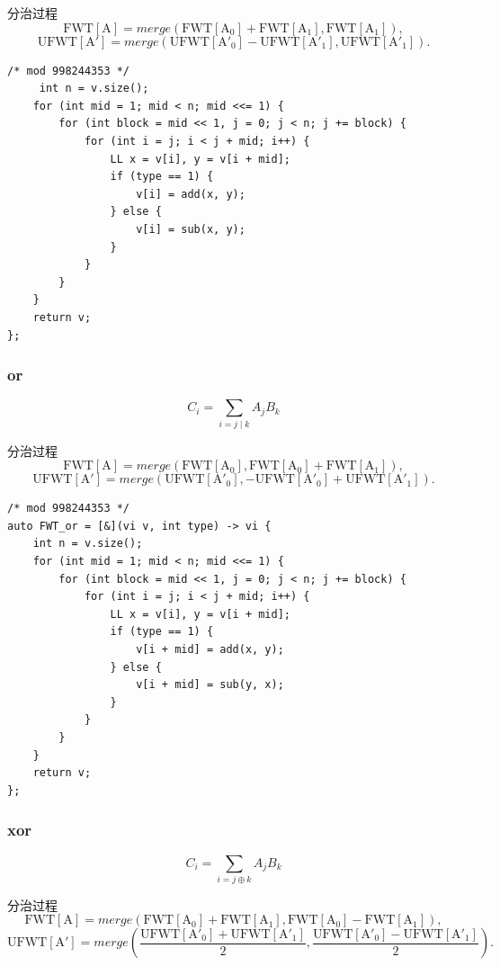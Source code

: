 \documentclass[UTF8, a4paper, titlepage, twoside]{ctexart}
\begin{document}
分治过程
\[
    \operatorname{FWT[A]} = merge(\operatorname{FWT[A_0]} + \operatorname{FWT[A_1]}, \operatorname{FWT[A_1]}),
\]
\[
    \operatorname{UFWT[A']} = merge(\operatorname{UFWT[A'_0]} - \operatorname{UFWT[A'_1]}, \operatorname{UFWT[A'_1]}).
\]

\begin{lstlisting}[style=cpp]
/* mod 998244353 */
     int n = v.size();
    for (int mid = 1; mid < n; mid <<= 1) {
        for (int block = mid << 1, j = 0; j < n; j += block) {
            for (int i = j; i < j + mid; i++) {
                LL x = v[i], y = v[i + mid];
                if (type == 1) {
                    v[i] = add(x, y);
                } else {
                    v[i] = sub(x, y);
                }
            }
        }
    }
    return v;
};
\end{lstlisting}

\subsubsection*{ or }
\[
    C_i = \sum\limits_{i = j \mid k} A_j B_k
\]

分治过程
\[
    \operatorname{FWT[A]} = merge(\operatorname{FWT[A_0]}, \operatorname{FWT[A_0]} + \operatorname{FWT[A_1]}),
\]
\[
    \operatorname{UFWT[A']} = merge(\operatorname{UFWT[A'_0]}, -\operatorname{UFWT[A'_0]} + \operatorname{UFWT[A'_1]}).
\]

\begin{lstlisting}[style=cpp]
/* mod 998244353 */
auto FWT_or = [&](vi v, int type) -> vi {
    int n = v.size();
    for (int mid = 1; mid < n; mid <<= 1) {
        for (int block = mid << 1, j = 0; j < n; j += block) {
            for (int i = j; i < j + mid; i++) {
                LL x = v[i], y = v[i + mid];
                if (type == 1) {
                    v[i + mid] = add(x, y);
                } else {
                    v[i + mid] = sub(y, x);
                }
            }
        }
    }
    return v;
};
\end{lstlisting}

\subsubsection*{ xor }
\[
    C_i = \sum\limits_{i = j \oplus k} A_j B_k
\]

分治过程
\[
    \operatorname{FWT[A]} = merge(\operatorname{FWT[A_0]} + \operatorname{FWT[A_1]}, \operatorname{FWT[A_0]} - \operatorname{FWT[A_1]}),
\]
\[
    \operatorname{UFWT[A']} = merge\left(\frac{\operatorname{UFWT[A'_0]} + \operatorname{UFWT[A'_1]}}{2}, \frac{\operatorname{UFWT[A'_0]} - \operatorname{UFWT[A'_1]}}{2}\right).
\]
\end{document}
